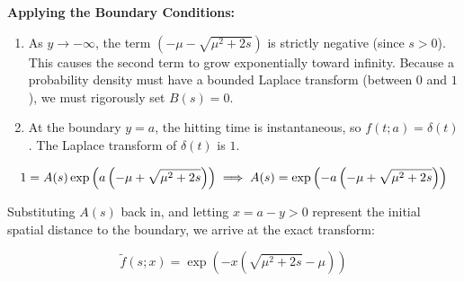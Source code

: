 \documentclass{beamer}
\begin{document}
\begin{frame}
\textbf{Applying the Boundary Conditions:}

\begin{enumerate}
  \item As $y \rightarrow -\infty$, the term $(-\mu - \sqrt{\mu^2 + 2s})$ is strictly negative (since $s > 0$). This causes the second term to grow exponentially toward infinity. Because a probability density must have a bounded Laplace transform (between $0$ and $1$), we must rigorously set $B(s) = 0$.
  \item At the boundary $y = a$, the hitting time is instantaneous, so $f(t; a) = \delta(t)$. The Laplace transform of $\delta(t)$ is $1$.
\end{enumerate}

\vspace{-0.3cm}

\[
1 = A(s) \exp \left( a \left( -\mu + \sqrt{\mu^2 + 2s} \right) \right) \implies 

\hfill A(s) = \exp \left( -a \left( -\mu + \sqrt{\mu^2 + 2s} \right) \right)
\]
\vspace{0.2cm}

Substituting $A(s)$ back in, and letting $x = a - y > 0$ represent the initial spatial distance to the boundary, we arrive at the exact transform:

\[
\tilde{f}(s;x) = \exp \left( -x \left( \sqrt{\mu^2 + 2s} - \mu \right) \right)
\]
\end{frame}
\end{document}
